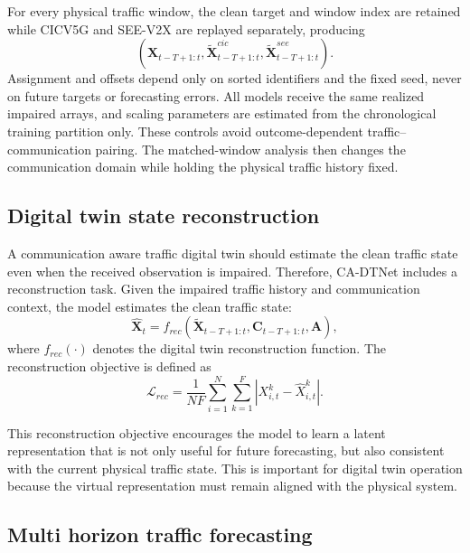 \documentclass[pdflatex,sn-mathphys-num]{sn-jnl}%
\newenvironment{changed}{}{}
\theoremstyle{thmstyleone}%
\theoremstyle{thmstyletwo}%
\theoremstyle{thmstylethree}%
\begin{document}
\begin{changed}
For every physical traffic window, the clean target and window index are retained while CICV5G and SEE-V2X are replayed separately, producing
\begin{equation}
\left(\mathbf{X}_{t-T+1:t},
\widetilde{\mathbf{X}}^{cic}_{t-T+1:t},
\widetilde{\mathbf{X}}^{see}_{t-T+1:t}\right).
\end{equation}
Assignment and offsets depend only on sorted identifiers and the fixed seed, never on future targets or forecasting errors. All models receive the same realized impaired arrays, and scaling parameters are estimated from the chronological training partition only. These controls avoid outcome-dependent traffic--communication pairing. The matched-window analysis then changes the communication domain while holding the physical traffic history fixed.
\end{changed}

\subsection{Digital twin state reconstruction}

A communication aware traffic digital twin should estimate the clean traffic state even when the received observation is impaired. Therefore, CA-DTNet includes a reconstruction task. Given the impaired traffic history and communication context, the model estimates the clean traffic state:
\begin{equation}
    \widehat{\mathbf{X}}_{t}
    =
    f_{rec}
    \left(
    \widetilde{\mathbf{X}}_{t-T+1:t},
    \mathbf{C}_{t-T+1:t},
    \mathbf{A}
    \right),
\end{equation}
where \(f_{rec}(\cdot)\) denotes the digital twin reconstruction function. The reconstruction objective is defined as
\begin{equation}
    \mathcal{L}_{rec}
    =
    \frac{1}{N F}
    \sum_{i=1}^{N}
    \sum_{k=1}^{F}
    \left|
    X_{i,t}^{k}
    -
    \widehat{X}_{i,t}^{k}
    \right|.
\end{equation}

This reconstruction objective encourages the model to learn a latent representation that is not only useful for future forecasting, but also consistent with the current physical traffic state. This is important for digital twin operation because the virtual representation must remain aligned with the physical system.

\subsection{Multi horizon traffic forecasting}
\end{document}
